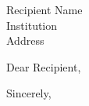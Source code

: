 \documentclass[12pt]{letter}
\begin{document}
\begin{letter}{Recipient Name\\Institution\\Address}
\opening{Dear Recipient,}


\closing{Sincerely,}
\end{letter}
\end{document}
